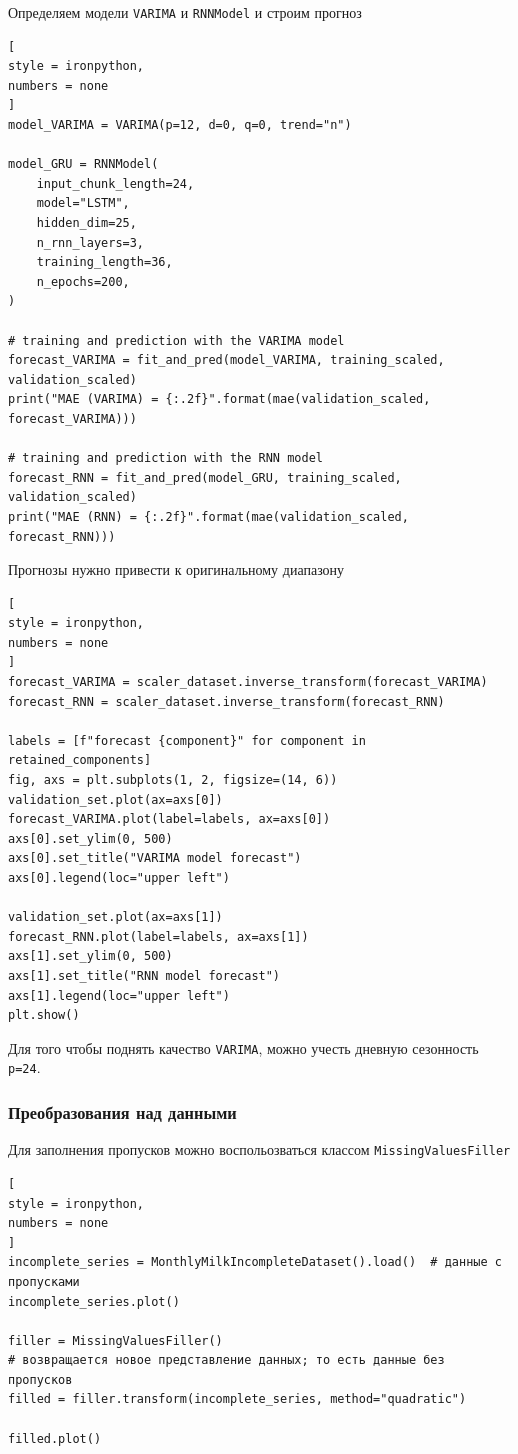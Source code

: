 \documentclass[%
	11pt,
	a4paper,
	utf8,
		]{article}
\begin{document}
Определяем модели \verb|VARIMA| и \verb|RNNModel| и строим прогноз
\begin{lstlisting}[
style = ironpython,
numbers = none
]
model_VARIMA = VARIMA(p=12, d=0, q=0, trend="n")

model_GRU = RNNModel(
	input_chunk_length=24,
	model="LSTM",
	hidden_dim=25,
	n_rnn_layers=3,
	training_length=36,
	n_epochs=200,
)

# training and prediction with the VARIMA model
forecast_VARIMA = fit_and_pred(model_VARIMA, training_scaled, validation_scaled)
print("MAE (VARIMA) = {:.2f}".format(mae(validation_scaled, forecast_VARIMA)))

# training and prediction with the RNN model
forecast_RNN = fit_and_pred(model_GRU, training_scaled, validation_scaled)
print("MAE (RNN) = {:.2f}".format(mae(validation_scaled, forecast_RNN)))
\end{lstlisting}

Прогнозы нужно привести к оригинальному диапазону
\begin{lstlisting}[
style = ironpython,
numbers = none
]
forecast_VARIMA = scaler_dataset.inverse_transform(forecast_VARIMA)
forecast_RNN = scaler_dataset.inverse_transform(forecast_RNN)

labels = [f"forecast {component}" for component in retained_components]
fig, axs = plt.subplots(1, 2, figsize=(14, 6))
validation_set.plot(ax=axs[0])
forecast_VARIMA.plot(label=labels, ax=axs[0])
axs[0].set_ylim(0, 500)
axs[0].set_title("VARIMA model forecast")
axs[0].legend(loc="upper left")

validation_set.plot(ax=axs[1])
forecast_RNN.plot(label=labels, ax=axs[1])
axs[1].set_ylim(0, 500)
axs[1].set_title("RNN model forecast")
axs[1].legend(loc="upper left")
plt.show()
\end{lstlisting}

Для того чтобы поднять качество \verb|VARIMA|, можно учесть дневную сезонность \verb|p=24|.

\subsubsection{Преобразования над данными}

Для заполнения пропусков можно воспольозваться классом \verb|MissingValuesFiller|
\begin{lstlisting}[
style = ironpython,
numbers = none
]
incomplete_series = MonthlyMilkIncompleteDataset().load()  # данные с пропусками
incomplete_series.plot()

filler = MissingValuesFiller()
# возвращается новое представление данных; то есть данные без пропусков
filled = filler.transform(incomplete_series, method="quadratic")

filled.plot()
\end{lstlisting}
\end{document}
